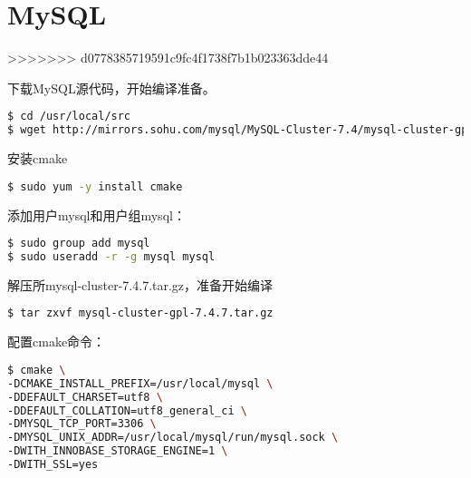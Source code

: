 \begin{lstlisting}[language=bash]

\end{lstlisting}




\begin{lstlisting}[language=bash]

\end{lstlisting}




\begin{lstlisting}[language=bash]

\end{lstlisting}




\section{MySQL}


>>>>>>> d0778385719591c9fc4f1738f7b1b023363dde44

下载MySQL源代码，开始编译准备。



\begin{lstlisting}[language=bash]
$ cd /usr/local/src
$ wget http://mirrors.sohu.com/mysql/MySQL-Cluster-7.4/mysql-cluster-gpl-7.4.7.tar.gz
\end{lstlisting}

安装cmake

\begin{lstlisting}[language=bash]
$ sudo yum -y install cmake
\end{lstlisting}

添加用户mysql和用户组mysql：


\begin{lstlisting}[language=bash]
$ sudo group add mysql
$ sudo useradd -r -g mysql mysql
\end{lstlisting}

解压所mysql-cluster-7.4.7.tar.gz，准备开始编译


\begin{lstlisting}[language=bash]
$ tar zxvf mysql-cluster-gpl-7.4.7.tar.gz
\end{lstlisting}

配置cmake命令：


\begin{lstlisting}[language=bash]
$ cmake \
-DCMAKE_INSTALL_PREFIX=/usr/local/mysql \
-DDEFAULT_CHARSET=utf8 \
-DDEFAULT_COLLATION=utf8_general_ci \
-DMYSQL_TCP_PORT=3306 \
-DMYSQL_UNIX_ADDR=/usr/local/mysql/run/mysql.sock \
-DWITH_INNOBASE_STORAGE_ENGINE=1 \
-DWITH_SSL=yes
\end{lstlisting}

